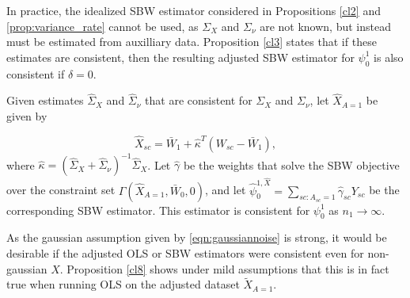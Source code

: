 In practice, the idealized SBW estimator considered in Propositions \ref{cl2} and \ref{prop:variance_rate} cannot be used, as $\Sigma_X$ and $\Sigma_{\nu}$ are not known, but instead must be estimated from auxilliary data. Proposition \ref{cl3} states that if these estimates are consistent, then the resulting adjusted SBW estimator for $\psi_0^1$ is also consistent if $\delta = 0$.

\begin{proposition}\label{cl3}
Given estimates $\hat{\Sigma}_X$ and $\hat{\Sigma}_\nu$ that are consistent for $\Sigma_X$ and $\Sigma_\nu$, let $\hat{X}_{A=1}$ be given by 

\[ \hat{X}_{sc} = \bar{W}_1 + \hat{\kappa}^T(W_{sc} - \bar{W}_1), \]
where $\hat{\kappa} = (\hat{\Sigma}_X + \hat{\Sigma}_{\nu})^{-1} \hat{\Sigma}_X$. Let $\hat{\gamma}$ be the weights that solve the SBW objective over the constraint set $\Gamma(\hat{X}_{A=1}, \bar{W}_0, 0)$, and let $\hat{\psi}^{1, \hat{X}}_0 = \sum_{sc: A_{sc} = 1} \hat{\gamma}_{sc} Y_{sc}$ be the corresponding SBW estimator. This estimator is consistent for $\psi_0^1$ as $n_1 \to \infty$.
\end{proposition}




As the gaussian assumption given by \eqref{eqn:gaussiannoise} is strong, it would be desirable if the adjusted OLS or SBW estimators were consistent even for non-gaussian $X$. Proposition \ref{cl8} shows under mild assumptions that this is in fact true when running OLS on the adjusted dataset $\tilde{X}_{A=1}$.


